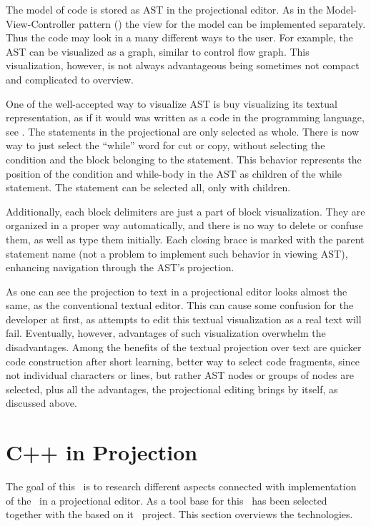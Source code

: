 The model of code is stored as AST in the projectional editor. As in the Model-View-Controller pattern (\cite{GOF95}) the view for
the model can be implemented separately. Thus the code may look in a many different ways to the user. For example, the AST can be
visualized as a graph, similar to control flow graph. This visualization, however, is not always advantageous being sometimes not compact and
complicated to overview.


One of the well-accepted way to visualize AST is buy visualizing its textual representation, as if it would was written 
as a code in the programming language, see . The statements in the projectional are only selected as whole.
There is now way to just select the ``while'' word for cut or copy, without selecting the condition and the block belonging
to the statement. This behavior represents the position of the condition and while-body in the AST as children of the while
statement. The statement can be selected all, only with children.

Additionally, each block delimiters are just a part of block visualization. They are organized in a proper way automatically,
and there is no way to delete or confuse them, as well as type them initially. Each closing brace is marked with the 
parent statement name (not a problem to implement such behavior in viewing AST), enhancing navigation through the AST's projection.

As one can see the projection to text in a projectional editor looks almost the same, as the conventional textual editor.
This can cause some confusion for the developer at first, as attempts to edit this textual visualization as a real text
will fail. Eventually, however, advantages of such visualization overwhelm the disadvantages. Among the benefits of the 
textual projection over text are quicker code construction after short learning, better way to select code fragments,
since not individual characters or lines, but rather AST nodes or groups of nodes are selected, plus all the advantages,
the projectional editing brings by itself, as discussed above.


\section{C++ in Projection}

The goal of this \MT\ is to research different aspects connected with implementation of the \cpppl\ in a projectional editor.
As a tool base for this \jbmps\ has been selected together with the based on it \mbdr\ project. This section overviews the technologies.

